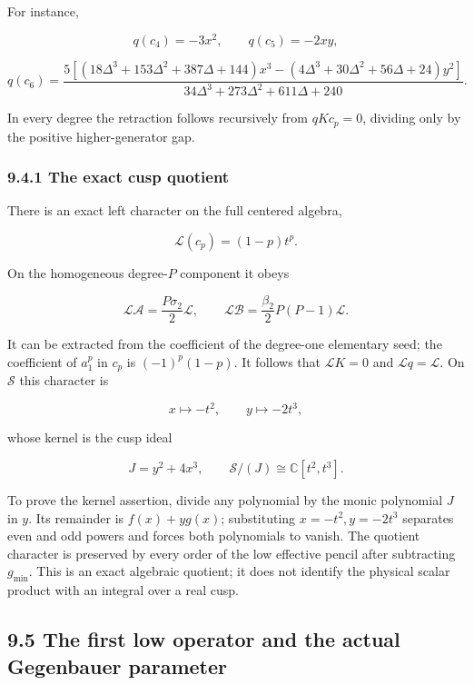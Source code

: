 \documentclass[a4paper,11pt]{article}
\numberwithin{equation}{section}
\begin{document}
For instance,

\[
q(c_4)=-3x^2,\qquad q(c_5)=-2xy,
\]

\[
q(c_6)=
\frac{5[(18\Delta^3+153\Delta^2+387\Delta+144)x^3
-(4\Delta^3+30\Delta^2+56\Delta+24)y^2]}
{34\Delta^3+273\Delta^2+611\Delta+240}.
\]

In every degree the retraction follows recursively from \(qKc_p=0\), dividing only by the positive higher-generator gap.

\hypertarget{the-exact-cusp-quotient}{%
\subsubsection{9.4.1 The exact cusp quotient}\label{the-exact-cusp-quotient}}

There is an exact left character on the full centered algebra,

\[
\mathcal L(c_p)=(1-p)t^p.
\]

On the homogeneous degree-\(P\) component it obeys

\[
\mathcal L\mathscr A=\frac{P\sigma_2}{2}\mathcal L,\qquad
\mathcal L\mathscr B=\frac{\beta_2}{2}P(P-1)\mathcal L.
\]

It can be extracted from the coefficient of the degree-one elementary seed; the coefficient of \(a_1^p\) in \(c_p\) is \((-1)^p(1-p)\). It follows that \(\mathcal LK=0\) and \(\mathcal Lq=\mathcal L\). On \(\mathcal S\) this character is

\[
x\longmapsto-t^2,\qquad y\longmapsto-2t^3,
\]

whose kernel is the cusp ideal

\[
J=y^2+4x^3,\qquad
\mathcal S/(J)\cong\mathbb C[t^2,t^3].
\]

To prove the kernel assertion, divide any polynomial by the monic polynomial \(J\) in \(y\). Its remainder is \(f(x)+yg(x)\); substituting \(x=-t^2,y=-2t^3\) separates even and odd powers and forces both polynomials to vanish. The quotient character is preserved by every order of the low effective pencil after subtracting \(g_{\min}\). This is an exact algebraic quotient; it does not identify the physical scalar product with an integral over a real cusp.

\hypertarget{the-first-low-operator-and-the-actual-gegenbauer-parameter}{%
\subsection{9.5 The first low operator and the actual Gegenbauer parameter}\label{the-first-low-operator-and-the-actual-gegenbauer-parameter}}
\end{document}
